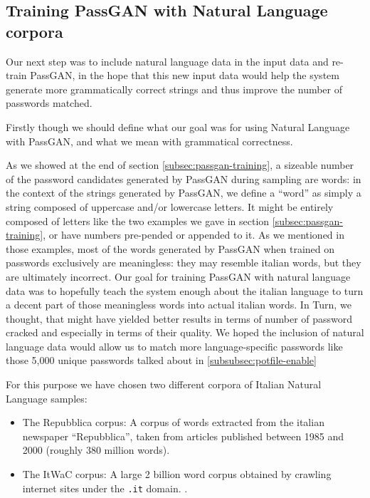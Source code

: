\subsection{Training PassGAN with Natural Language corpora} \label{subsec:nl-testing}
Our next step was to include natural language data in the input data and re-train PassGAN, in the hope that this new input data would help the system generate more grammatically correct strings and thus improve the number of passwords matched.

Firstly though we should define what our goal was for using Natural Language with PassGAN, and what we mean with grammatical correctness. 

As we showed at the end of section \ref{subsec:passgan-training}, a sizeable number of the password candidates generated by PassGAN during sampling are words: in the context of the strings generated by PassGAN, we define a \enquote{word} as simply a string composed of uppercase and/or lowercase letters. It might be entirely composed of letters like the two examples we gave in section \ref{subsec:passgan-training}, or have numbers pre-pended or appended to it. As we mentioned in those examples, most of the words generated by PassGAN when trained on passwords exclusively are meaningless: they may resemble italian words, but they are ultimately incorrect.
Our goal for training PassGAN with natural language data was to hopefully teach the system enough about the italian language to turn a decent part of those meaningless words into actual italian words. In Turn, we thought, that might have yielded better results in terms of number of password cracked and especially in terms of their quality. We hoped the inclusion of natural language data would allow us to match more language-specific passwords like those 5,000 unique passwords talked about in \ref{subsubsec:potfile-enable}   

For this purpose we have chosen two different corpora of Italian Natural Language samples: 
\begin{itemize}
    \item The Repubblica corpus: A corpus of words extracted from the italian newspaper \enquote{Repubblica}, taken from articles published between 1985 and 2000 (roughly 380 million words).\cite{repubblica_corpus}
    \item The ItWaC corpus: A large 2 billion word corpus obtained by crawling internet sites under the \texttt{.it} domain. \cite{itwac_corpus}.  
\end{itemize}

